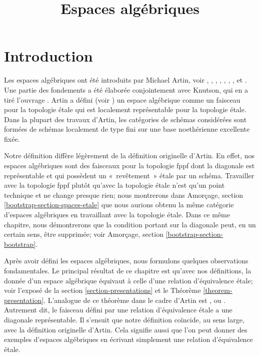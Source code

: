 

%


\title{Espaces algébriques}


\maketitle

\label{section-phantom}

\tableofcontents

\section{Introduction}
\label{section-introduction}

\noindent
Les espaces algébriques ont été introduits par Michael Artin,
voir \cite{ArtinI}, \cite{ArtinII},
\cite{Artin-Theorem-Representability},
\cite{Artin-Construction-Techniques},
\cite{Artin-Algebraic-Spaces},
\cite{Artin-Algebraic-Approximation},
\cite{Artin-Implicit-Function},
et \cite{ArtinVersal}.
Une partie des fondements a été élaborée conjointement avec
Knutson, qui en a tiré l'ouvrage \cite{Kn}.
Artin a défini (voir \cite[Définition 1.3]{Artin-Implicit-Function})
un espace algébrique comme un faisceau pour la topologie étale
qui est localement représentable pour la topologie étale.
Dans la plupart des travaux d'Artin, les catégories de schémas
considérées sont formées de schémas localement de type fini sur une base
noethérienne excellente fixée.

\medskip\noindent
Notre définition diffère légèrement de la définition originelle d'Artin.
En effet, nos espaces algébriques sont des faisceaux pour la topologie fppf
dont la diagonale est représentable et qui possèdent un «~revêtement~» étale
par un schéma. Travailler avec la topologie fppf plutôt qu'avec la topologie
étale n'est qu'un point technique et ne change presque
rien; nous montrerons dans
Amorçage, section \ref{bootstrap-section-spaces-etale}
que nous aurions obtenu la même catégorie d'espaces algébriques
en travaillant avec la topologie étale. Dans ce même chapitre,
nous démontrerons que la condition portant sur la diagonale
peut, en un certain sens, être supprimée; voir
Amorçage, section \ref{bootstrap-section-bootstrap}.

\medskip\noindent
Après avoir défini les espaces algébriques, nous formulons quelques
observations fondamentales. Le principal résultat de ce chapitre est qu'avec
nos définitions, la donnée d'un espace algébrique équivaut à celle d'une
relation d'équivalence étale; voir l'exposé de la section
\ref{section-presentations} et le Théorème \ref{theorem-presentation}.
L'analogue de ce théorème dans le cadre d'Artin est \cite[Théorème 1.5]{Artin-Implicit-Function}, ou
\cite[Proposition II.1.7]{Kn}. Autrement dit, le faisceau
défini par une relation d'équivalence étale a une diagonale représentable.
Il s'ensuit que notre définition coïncide, au sens large, avec la définition
originelle d'Artin. Cela signifie aussi que l'on peut donner des exemples
d'espaces algébriques en écrivant simplement une relation d'équivalence étale.

